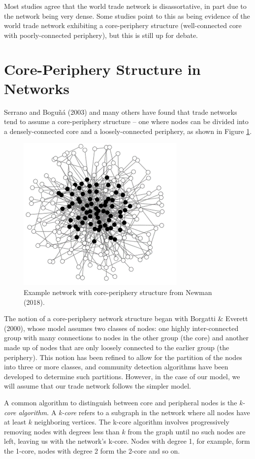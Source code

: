 \documentclass[12pt,letterpaper]{report}
\begin{document}
	Most studies agree that the world trade network is disassortative, in part due to the network being very dense. Some studies point to this as being evidence of the world trade network exhibiting a core-periphery structure (well-connected core with poorly-connected periphery), but this is still up for debate.
	
\section{Core-Periphery Structure in Networks}
\label{sec:32Basics}
	
	Serrano and Boguñá (2003) and many others have found that trade networks tend to assume a core-periphery structure – one where nodes can be divided into a densely-connected core and a loosely-connected periphery, as shown in Figure \ref{fig:303CorePeriphery}. \cite{newman2018networks} 
	
	\begin{figure}[!h]
		\centering
	 	\includegraphics[width=0.25\columnwidth]{Fig303-CorePeriphery.png}
	 	\caption{Example network with core-periphery structure from Newman (2018).}\label{fig:303CorePeriphery}
	\end{figure}	
	
	The notion of a core-periphery network structure began with Borgatti \& Everett (2000), whose model assumes two classes of nodes: one highly inter-connected group with many connections to nodes in the other group (the core) and another made up of nodes that are only loosely connected to the earlier group (the periphery). This notion has been refined to allow for the partition of the nodes into three or more classes, and community detection algorithms have been developed to determine such partitions. However, in the case of our model, we will assume that our trade network follows the simpler model.
	
	A common algorithm to distinguish between core and peripheral nodes is the \textit{k-core algorithm}. A \textit{k-core} refers to a subgraph in the network where all nodes have at least $k$ neighboring vertices. The k-core algorithm involves progressively removing nodes with degrees less than $k$ from the graph until no such nodes are left, leaving us with the network's k-core. Nodes with degree 1, for example, form the 1-core, nodes with degree 2 form the 2-core and so on. \cite{borgatti2018analyzing}
	
\end{document}
